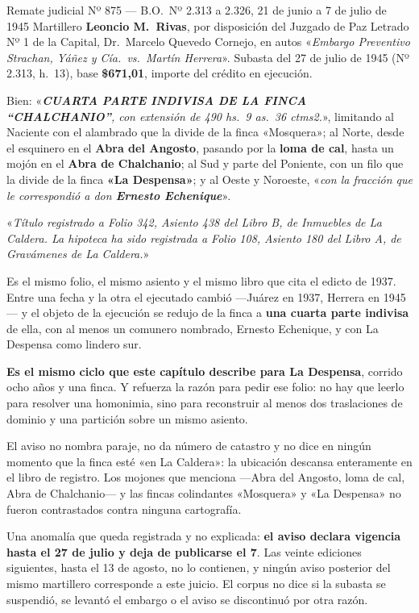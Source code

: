 \begin{ficha}{Remate judicial Nº 875 --- B.O.\ Nº 2.313 a 2.326, 21 de junio a 7 de julio de 1945}
Martillero \textbf{Leoncio M.\ Rivas}, por disposición del Juzgado de Paz Letrado Nº 1 de la
Capital, Dr.\ Marcelo Quevedo Cornejo, en autos «\textit{Embargo Preventivo Strachan, Yáñez y
Cía.\ vs.\ Martín Herrera}». Subasta del 27 de julio de 1945 (Nº 2.313, h.\ 13), base \textbf{\$671,01}, importe
del crédito en ejecución.

Bien: «\textit{\textbf{CUARTA PARTE INDIVISA DE LA FINCA ``CHALCHANIO''}, con extensión de 490
hs.\ 9 as.\ 36 ctms2.}», limitando al Naciente con el alambrado que la divide de la finca
«Mosquera»; al Norte, desde el esquinero en el \textbf{Abra del Angosto}, pasando por la
\textbf{loma de cal}, hasta un mojón en el \textbf{Abra de Chalchanio}; al Sud y parte del
Poniente, con un filo que la divide de la finca \textbf{«La Despensa»}; y al Oeste y Noroeste,
«\textit{con la fracción que le correspondió a don \textbf{Ernesto Echenique}}».

«\textit{Título registrado a Folio 342, Asiento 438 del Libro B, de Inmuebles de La Caldera. La
hipoteca ha sido registrada a Folio 108, Asiento 180 del Libro A, de Gravámenes de La Caldera.}»
\end{ficha}

Es el mismo folio, el mismo asiento y el mismo libro que cita el edicto de 1937. Entre una
fecha y la otra el ejecutado cambió ---Juárez en 1937, Herrera en 1945--- y el objeto de la
ejecución se redujo de la finca a \textbf{una cuarta parte indivisa} de ella, con al menos un
comunero nombrado, Ernesto Echenique, y con La Despensa como lindero sur.

\textbf{Es el mismo ciclo que este capítulo describe para La Despensa}, corrido ocho años y
una finca. Y refuerza la razón para pedir ese folio: no hay que leerlo para resolver una
homonimia, sino para reconstruir al menos dos traslaciones de dominio y una partición sobre un mismo asiento.

\begin{cautela}
El aviso no nombra paraje, no da número de catastro y no dice en ningún momento que la finca
esté «en La Caldera»: la ubicación descansa enteramente en el libro de registro. Los mojones
que menciona ---Abra del Angosto, loma de cal, Abra de Chalchanio--- y las fincas colindantes
«Mosquera» y «La Despensa» no fueron contrastados contra ninguna cartografía.

Una anomalía que queda registrada y no explicada: \textbf{el aviso declara vigencia hasta el 27
de julio y deja de publicarse el 7}. Las veinte ediciones siguientes, hasta el 13 de agosto, no
lo contienen, y ningún aviso posterior del mismo martillero corresponde a este juicio. El
corpus no dice si la subasta se suspendió, se levantó el embargo o el aviso se discontinuó por
otra razón.
\end{cautela}

